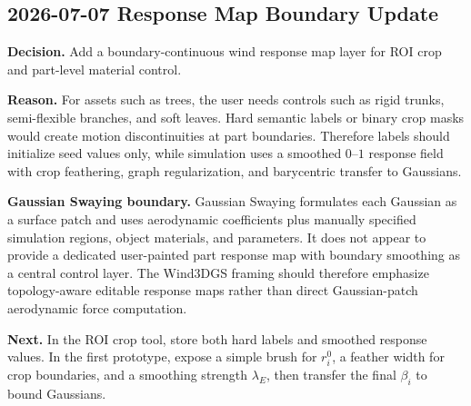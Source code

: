 \documentclass[11pt]{article}
\begin{document}
\subsection*{2026-07-07 Response Map Boundary Update}

\textbf{Decision.} Add a boundary-continuous wind response map layer for ROI crop and part-level material control.

\textbf{Reason.} For assets such as trees, the user needs controls such as rigid trunks, semi-flexible branches, and soft leaves. Hard semantic labels or binary crop masks would create motion discontinuities at part boundaries. Therefore labels should initialize seed values only, while simulation uses a smoothed \(0\)--\(1\) response field with crop feathering, graph regularization, and barycentric transfer to Gaussians.

\textbf{Gaussian Swaying boundary.} Gaussian Swaying formulates each Gaussian as a surface patch and uses aerodynamic coefficients plus manually specified simulation regions, object materials, and parameters. It does not appear to provide a dedicated user-painted part response map with boundary smoothing as a central control layer. The Wind3DGS framing should therefore emphasize topology-aware editable response maps rather than direct Gaussian-patch aerodynamic force computation.

\textbf{Next.} In the ROI crop tool, store both hard labels and smoothed response values. In the first prototype, expose a simple brush for \(r_i^0\), a feather width for crop boundaries, and a smoothing strength \(\lambda_E\), then transfer the final \(\beta_i\) to bound Gaussians.



\end{document}
